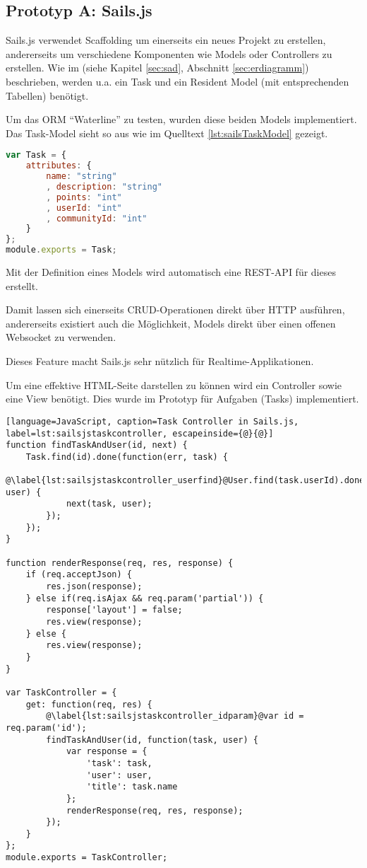 \subsection{Prototyp A: Sails.js}
Sails.js verwendet \gls{Scaffolding} um einerseits ein neues Projekt zu erstellen, andererseits  um verschiedene Komponenten wie Models oder Controllers zu erstellen. Wie im  (siehe Kapitel \ref{sec:sad}, Abschnitt \ref{sec:erdiagramm}) beschrieben, werden u.a. ein Task und ein Resident Model (mit entsprechenden Tabellen) benötigt.

Um das \gls{ORM} ``Waterline'' \cite{Waterline} zu testen, wurden diese beiden Models implementiert. Das Task-Model sieht so aus wie im Quelltext \ref{lst:sailsTaskModel} gezeigt.

\begin{lstlisting}[language=JavaScript, caption=Task Model in Sails.js, label=lst:sailsTaskModel]
var Task = {
	attributes: {
		name: "string"
		, description: "string"
		, points: "int"
		, userId: "int"
		, communityId: "int"
	}
};
module.exports = Task;
\end{lstlisting}

Mit der Definition eines Models wird automatisch eine \gls{REST}-API für dieses erstellt.

Damit lassen sich einerseits CRUD-Operationen direkt über HTTP ausführen, andererseits existiert auch die Möglichkeit, Models direkt über einen offenen \gls{Websocket} zu verwenden.

Dieses Feature macht Sails.js sehr nützlich für \gls{Realtime}-Applikationen.

Um eine effektive HTML-Seite darstellen zu können wird ein Controller sowie eine View benötigt. Dies wurde im Prototyp für Aufgaben (Tasks) implementiert.

\newpage
\begin{lstlisting}[language=JavaScript, caption=Task Controller in Sails.js, label=lst:sailsjstaskcontroller, escapeinside={@}{@}]
function findTaskAndUser(id, next) {
	Task.find(id).done(function(err, task) {
		@\label{lst:sailsjstaskcontroller_userfind}@User.find(task.userId).done(function(err, user) {
			next(task, user);
		});
	});
}

function renderResponse(req, res, response) {
	if (req.acceptJson) {
		res.json(response);
	} else if(req.isAjax && req.param('partial')) {
		response['layout'] = false;
		res.view(response);
	} else {
		res.view(response);
	}
}

var TaskController = {
	get: function(req, res) {
		@\label{lst:sailsjstaskcontroller_idparam}@var id = req.param('id');
		findTaskAndUser(id, function(task, user) {
			var response = {
				'task': task,
				'user': user,
				'title': task.name
			};
			renderResponse(req, res, response);
		});
	}
};
module.exports = TaskController;
\end{lstlisting}

